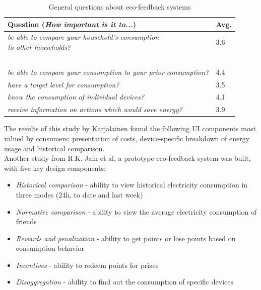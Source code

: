 \documentclass[journal]{vgtc}                %
\begin{document}
\begin{table}
  \caption{General questions about eco-feedback systems}
  \label{prototypesquestions}
  \scriptsize
  \begin{center}
    \begin{tabular}{|ll|}
    \hline
       Question (\textit{How important is it to...}) & Avg. \\ \hline
       \pbox{20cm}{\textit{be able to compare your household's consumption}\\\textit{to other households?}} & 3.6 \\ ~\\[-0.25cm]
       \textit{be able to compare your consumption to your prior consumption?} & 4.4 \\ 
       \textit{have a target level for consumption?} & 3.5 \\ 
       \textit{know the consumption of individual devices?} & 4.1 \\ 
       \textit{receive information on actions which would save energy?} & 3.9 \\
       \hline
    \end{tabular}
  \end{center}
\end{table}

The results of this study by Karjalainen found the following UI components most valued by consumers: presentation of costs, device-specific breakdown of energy usage and historical comparison.
~\\

Another study from R.K. Jain et al\cite{jain2012assessing}, a prototype eco-feedback system was built, with five key design components:
\begin{itemize}
\item \textit{Historical comparison} - ability to view historical electricity consumption in three modes (24h, to date and last week)
\item \textit{Normative comparison} - ability to view the average electricity consumption of friends
\item \textit{Rewards and penalization} - ability to get points or lose points based on consumption behavior
\item \textit{Incentives} - ability to redeem points for prizes
\item \textit{Disaggregation} - ability to find out the consumption of specific devices
\end{itemize}
\end{document}
